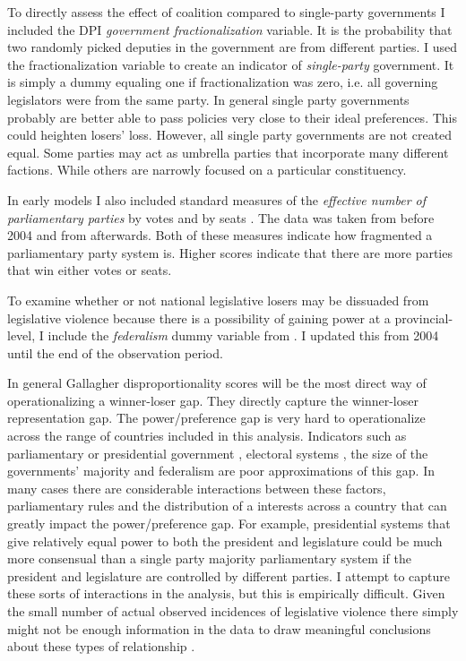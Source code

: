 \documentclass[a4paper]{article}\usepackage{graphicx, color}
\begin{document}
To directly assess the effect of coalition compared to single-party governments I included the DPI {\emph{government fractionalization}} variable. It is the probability that two randomly picked deputies in the government are from different parties. I used the fractionalization variable to create an indicator of {\emph{single-party}} government. It is simply a dummy equaling one if fractionalization was zero, i.e. all governing legislators were from the same party. In general single party governments probably are better able to pass policies very close to their ideal preferences. This could heighten losers' loss. However, all single party governments are not created equal. Some parties may act as umbrella parties that incorporate many different factions. While others are narrowly focused on a particular constituency. 

In early models I also included standard measures of the \emph{effective number of parliamentary parties} by votes and by seats \citep[see][]{Laakso1979, Taagepera1989}. The data was taken from \cite{Carey2011} before 2004 and from \cite{Gallagher2012} afterwards. Both of these measures indicate how fragmented a parliamentary party system is. Higher scores indicate that there are more parties that win either votes or seats.

To examine whether or not national legislative losers may be dissuaded from legislative violence because there is a possibility of gaining power at a provincial-level, I include the \emph{federalism} dummy variable from \cite{Carey2011}. I updated this from 2004 until the end of the observation period.

In general Gallagher disproportionality scores will be the most direct way of operationalizing a winner-loser gap. They directly capture the winner-loser representation gap. The power/preference gap is very hard to operationalize across the range of countries included in this analysis. Indicators such as parliamentary or presidential government \citep{Horowitz1990}, electoral systems \cite{Lijphart1994}, the size of the governments' majority and federalism are poor approximations of this gap. In many cases there are considerable interactions between these factors, parliamentary rules and the distribution of a interests across a country that can greatly impact the power/preference gap. For example, presidential systems that give relatively equal power to both the president and legislature could be much more consensual than a single party majority parliamentary system if the president and legislature are controlled by different parties. I attempt to capture these sorts of interactions in the analysis, but this is empirically difficult. Given the small number of actual observed incidences of legislative violence there simply might not be enough information in the data to draw meaningful conclusions about these types of relationship \citep[see][]{Brambor2006}.
\end{document}
